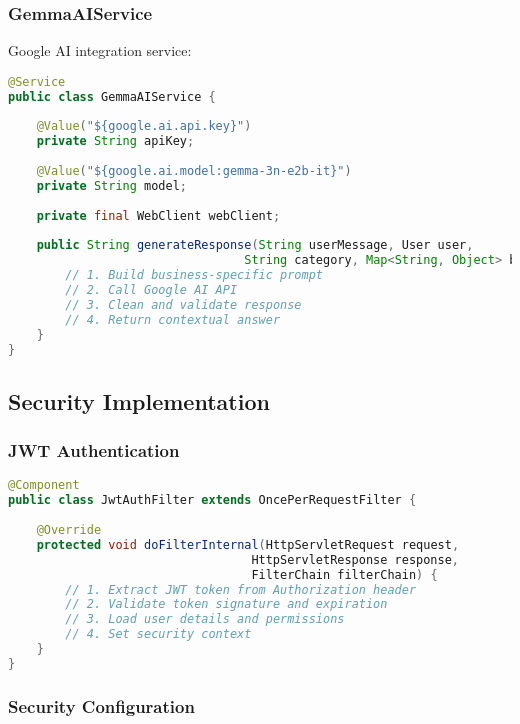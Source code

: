 \documentclass[11pt,a4paper]{article}
\begin{document}
\subsubsection{GemmaAIService}
Google AI integration service:

\begin{lstlisting}[language=java, caption=Google AI Integration]
@Service
public class GemmaAIService {
    
    @Value("${google.ai.api.key}")
    private String apiKey;
    
    @Value("${google.ai.model:gemma-3n-e2b-it}")
    private String model;
    
    private final WebClient webClient;
    
    public String generateResponse(String userMessage, User user, 
                                 String category, Map<String, Object> businessContext) {
        // 1. Build business-specific prompt
        // 2. Call Google AI API
        // 3. Clean and validate response
        // 4. Return contextual answer
    }
}
\end{lstlisting}

\subsection{Security Implementation}

\subsubsection{JWT Authentication}

\begin{lstlisting}[language=java, caption=JWT Security Filter]
@Component
public class JwtAuthFilter extends OncePerRequestFilter {
    
    @Override
    protected void doFilterInternal(HttpServletRequest request,
                                  HttpServletResponse response,
                                  FilterChain filterChain) {
        // 1. Extract JWT token from Authorization header
        // 2. Validate token signature and expiration
        // 3. Load user details and permissions
        // 4. Set security context
    }
}
\end{lstlisting}

\subsubsection{Security Configuration}
\end{document}
